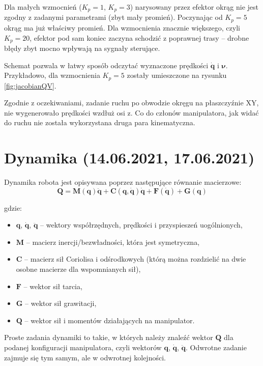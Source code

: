 \documentclass[11pt, a4paper]{article}
\begin{document}
Dla małych wzmocnień ($K_p = 1$, $K_p = 3$) narysowany przez efektor okrąg nie jest zgodny z zadanymi parametrami (zbyt mały promień). Poczynając od $K_p = 5$ okrąg ma już właściwy promień. Dla wzmocnienia znacznie większego, czyli $K_p = 20$, efektor pod sam koniec zaczyna schodzić z poprawnej trasy -- drobne błędy zbyt mocno wpływają na sygnały sterujące.

Schemat pozwala w łatwy sposób odczytać wyznaczone prędkości $\dot{\mathbf{q}}$ i $\boldsymbol{\nu}$. Przykładowo, dla wzmocnienia $K_p = 5$ zostały umieszczone na rysunku \ref{fig:jacobianQV}.


Zgodnie z oczekiwaniami, zadanie ruchu po obwodzie okręgu na płaszczyźnie XY, nie wygenerowało prędkości wzdłuż osi z. Co do członów manipulatora, jak widać do ruchu nie została wykorzystana druga para kinematyczna.

\newpage



%
%

\section{Dynamika (14.06.2021, 17.06.2021)}

Dynamika robota jest opisywana poprzez następujące równanie macierzowe:
\begin{equation*}
\mathbf{Q} =
	\mathbf{M} (\mathbf{q}) \ddot{\mathbf{q}} +
	\mathbf{C} (\mathbf{q}, \dot{\mathbf{q}}) \dot{\mathbf{q}} +
	\mathbf{F} (\dot{\mathbf{q}}) +
	\mathbf{G}(\mathbf{q})
\end{equation*}

gdzie:
\begin{itemize}
\item $\mathbf{q}$, $\dot{\mathbf{q}}$, $\ddot{\mathbf{q}}$ -- wektory współrzędnych, prędkości i przyspieszeń uogólnionych,
\item $\mathbf{M}$ -- macierz inercji/bezwładności, która jest symetryczna,
\item $\mathbf{C}$ -- macierz sił Coriolisa i odśrodkowych (którą można rozdzielić na dwie osobne macierze dla wspomnianych sił),
\item $\mathbf{F}$ -- wektor sił tarcia,
\item $\mathbf{G}$ -- wektor sił grawitacji,
\item $\mathbf{Q}$ -- wektor sił i momentów działających na manipulator.
\end{itemize}

Proste zadania dynamiki to takie, w których należy znaleźć wektor $\mathbf{Q}$ dla podanej konfiguracji manipulatora, czyli wektorów $\mathbf{q}$, $\dot{\mathbf{q}}$, $\ddot{\mathbf{q}}$. Odwrotne zadanie zajmuje się tym samym, ale w odwrotnej kolejności.
\end{document}
